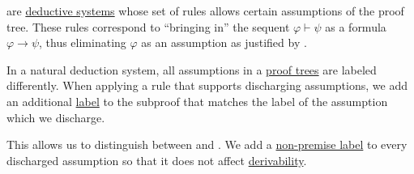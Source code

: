 \begin{definition}\label{def:natural_deduction_system}\mimprovised
   are \hyperref[def:deductive_system]{deductive systems} whose set of rules allows  certain assumptions of the proof tree. These rules correspond to \enquote{bringing in} the sequent \( \varphi \vdash \psi \) as a formula \( \varphi \to \psi \), thus eliminating \( \varphi \) as an assumption as justified by .

  In a natural deduction system, all assumptions in a \hyperref[def:proof_tree]{proof trees} are labeled differently. When applying a rule that supports discharging assumptions, we add an additional \hyperref[def:weighted_set]{label} to the subproof that matches the label of the assumption which we discharge.

  This allows us to distinguish between  and . We add a \hyperref[def:proof_tree/premises]{non-premise label} to every discharged assumption so that it does not affect \hyperref[def:proof_derivability]{derivability}.
\end{definition}

